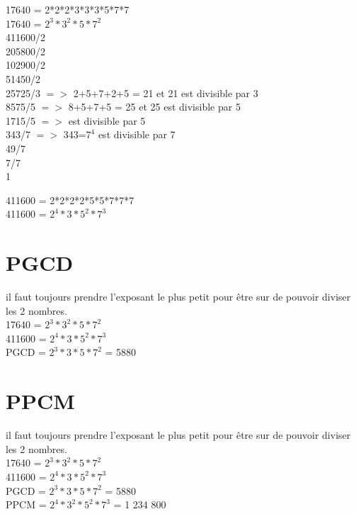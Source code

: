 17640 = 2*2*2*3*3*3*5*7*7 \\
17640 = $2^{3}*3^{2}*5*7^{2}$ \\


411600/2 \\
205800/2 \\
102900/2 \\
51450/2 \\
25725/3 $=>$ 2+5+7+2+5 = 21 et 21 est divisible par 3 \\
8575/5 $=>$ 8+5+7+5 = 25 et 25 est divisible par 5 \\
1715/5 $=>$ est divisible par 5 \\
343/7 $=>$ 343=$7^{4}$ est divisible par 7 \\
49/7 \\
7/7 \\
1

411600 = 2*2*2*2*5*5*7*7*7 \\
411600 = $2^{4}*3*5^{2}*7^{3}$ \\

\section{PGCD}

il faut toujours prendre l'exposant le plus petit pour être sur de pouvoir diviser les 2 nombres. \\

17640 = $2^{3}*3^{2}*5*7^{2}$ \\
411600 = $2^{4}*3*5^{2}*7^{3}$ \\

PGCD = $2^{3}*3*5*7^{2}$ = 5880

\section{PPCM}

il faut toujours prendre l'exposant le plus petit pour être sur de pouvoir diviser les 2 nombres. \\

17640 = $2^{3}*3^{2}*5*7^{2}$ \\
411600 = $2^{4}*3*5^{2}*7^{3}$ \\

PGCD = $2^{3}*3*5*7^{2}$ = 5880 \\
PPCM = $2^{4}*3^{2}*5^{2}*7^{3}$ = 1 234 800 \\

